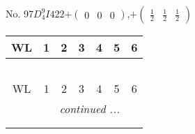 \documentclass[fleqn,9pt,landscape]{jsarticle}
\begin{document}
\newpage
No. 97\quad$D_{4}^{9}$\quad$I422$\quad[ tetragonal ]\quad$+\begin{pmatrix} 0 & 0 & 0 \end{pmatrix}$,\quad $+\begin{pmatrix} \frac{1}{2} & \frac{1}{2} & \frac{1}{2} \end{pmatrix}$
\begin{center}
\renewcommand{\arraystretch}{1.2}
\begin{longtable}{ccccccc}
 \hline \hline
WL & 1 & 2 & 3 & 4 & 5 & 6 \\ \hline \endfirsthead

\multicolumn{6}{l}{\tablename\ \thetable{}} \\
 \hline \hline
WL & 1 & 2 & 3 & 4 & 5 & 6 \\ \hline \endhead

 \hline \hline
\multicolumn{6}{r}{\footnotesize\it continued ...} \\ \endfoot

 \hline \hline
\multicolumn{6}{r}{} \\ \endlastfoot


\end{longtable}
\end{center}
\end{document}
